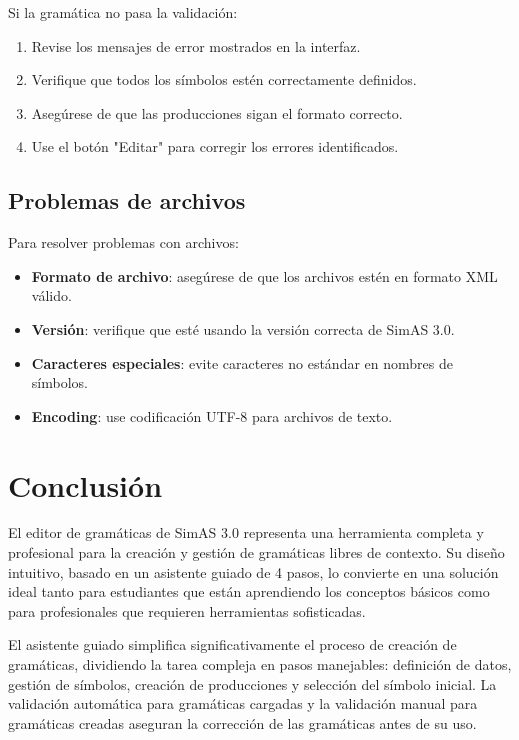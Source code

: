 Si la gramática no pasa la validación:

\begin{enumerate}
    \item Revise los mensajes de error mostrados en la interfaz.
    \item Verifique que todos los símbolos estén correctamente definidos.
    \item Asegúrese de que las producciones sigan el formato correcto.
    \item Use el botón \string"Editar\string" para corregir los errores identificados.
\end{enumerate}

\subsection{Problemas de archivos}

Para resolver problemas con archivos:

\begin{itemize}
    \item \textbf{Formato de archivo}: asegúrese de que los archivos estén en formato XML válido.
    \item \textbf{Versión}: verifique que esté usando la versión correcta de SimAS 3.0.
    \item \textbf{Caracteres especiales}: evite caracteres no estándar en nombres de símbolos.
    \item \textbf{Encoding}: use codificación UTF-8 para archivos de texto.
\end{itemize}

\section{Conclusión}

El editor de gramáticas de SimAS 3.0 representa una herramienta completa y profesional para la creación y gestión de gramáticas libres de contexto. Su diseño intuitivo, basado en un asistente guiado de 4 pasos, lo convierte en una solución ideal tanto para estudiantes que están aprendiendo los conceptos básicos como para profesionales que requieren herramientas sofisticadas.

El asistente guiado simplifica significativamente el proceso de creación de gramáticas, dividiendo la tarea compleja en pasos manejables: definición de datos, gestión de símbolos, creación de producciones y selección del símbolo inicial. La validación automática para gramáticas cargadas y la validación manual para gramáticas creadas aseguran la corrección de las gramáticas antes de su uso.

